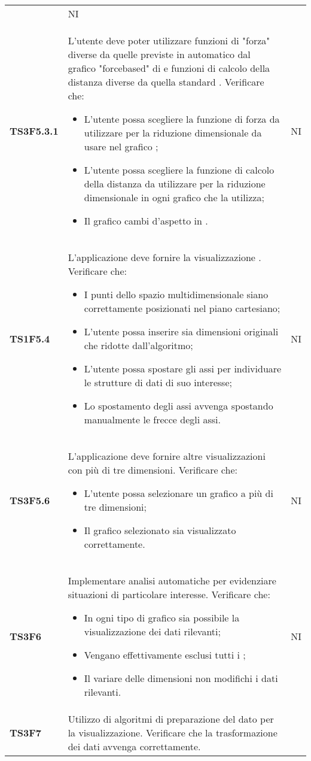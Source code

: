 \begin{longtable}{C{2cm} C{12cm} C{1.5cm}}
				 & NI \\
\textbf{TS3F5.3.1} & L'utente deve poter utilizzare funzioni di "forza" diverse da quelle previste in automatico dal grafico "forcebased" di  e funzioni di calcolo della distanza diverse da quella standard . Verificare che:
					\begin{itemize}
						\item L'utente possa scegliere la funzione di forza da utilizzare per la riduzione dimensionale da usare nel grafico ;
						\item L'utente possa scegliere la funzione di calcolo della distanza da utilizzare per la riduzione dimensionale in ogni grafico che la utilizza;
						\item Il grafico cambi d'aspetto in .
					\end{itemize}
				   & NI \\
\textbf{TS1F5.4} & L'applicazione deve fornire la visualizzazione . Verificare che:
					\begin{itemize}
						\item I punti dello spazio multidimensionale siano correttamente posizionati nel piano cartesiano;
						\item L'utente possa inserire sia dimensioni originali che ridotte dall'algoritmo;
						\item L'utente possa spostare gli assi per individuare le strutture di dati di suo interesse;
						\item Lo spostamento degli assi avvenga spostando manualmente le frecce degli assi.
					\end{itemize}	
				   & NI \\
\textbf{TS3F5.6} & L'applicazione deve fornire altre visualizzazioni con più di tre dimensioni. Verificare che:
					\begin{itemize}
						\item L'utente possa selezionare un grafico a più di tre dimensioni;
						\item Il grafico selezionato sia visualizzato correttamente.
					\end{itemize}	
				   & NI \\
\textbf{TS3F6} & Implementare analisi automatiche per evidenziare situazioni di particolare interesse. Verificare che: 
					\begin{itemize}
						\item In ogni tipo di grafico sia possibile la visualizzazione dei dati rilevanti;
						\item Vengano effettivamente esclusi tutti i ;
						\item Il variare delle dimensioni non modifichi i dati rilevanti.
					\end{itemize}		
			   & NI \\
\textbf{TS3F7} & Utilizzo di algoritmi di preparazione del dato per la visualizzazione. Verificare che la trasformazione dei dati avvenga correttamente.
					

\end{longtable}
